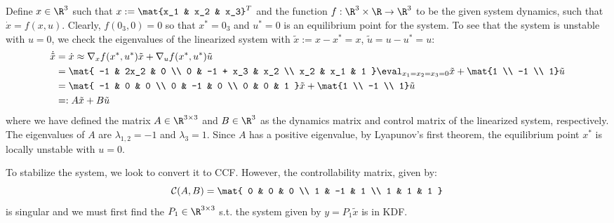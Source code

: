 \documentclass{homework}
\newcommand{\control}{\mathcal{C}}
\begin{document}
\subsection{}
Define $x\in\R^3$ such that $x:=\mat{x_1 & x_2 & x_3}^T$ and the function $f: \R^3 \times \R \to \R^3$
to be the given system dynamics, such that $\dot{x} = f(x,u)$. Clearly, $f(0_3, 0) = 0$ so that 
$x^* = 0_3$ and $u^*=0$ is an equilibrium point for the system. To see that the system is unstable with $u = 0$, we check
the eigenvalues of the linearized system with $\tilde{x} := x - x^* = x$, $\tilde{u} = u - u^* = u$:
\begin{align*}
    \dot{\tilde{x}} &= \dot{x} \approx \nabla_x f(x^*, u^*) \tilde{x} + \nabla_u f(x^*, u^*) \tilde{u} \\
        &= \mat{
            -1 & 2x_2 & 0 \\
            0 & -1 + x_3 & x_2 \\
            x_2 & x_1 & 1
        } \eval_{x_1=x_2=x_3=0} \tilde{x} + \mat{1 \\ -1 \\ 1} \tilde{u} \\
        &= \mat{
            -1 & 0 & 0 \\
            0 & -1 & 0 \\
            0 & 0 & 1
        } \tilde{x} + \mat{1 \\ -1 \\ 1} \tilde{u} \\
        &=: A\tilde{x} + B \tilde{u}
\end{align*}
where we have defined the matrix $A\in\R^{3\times 3}$ and $B\in\R^3$ as the dynamics matrix and control matrix of the linearized system,
respectively.  The eigenvalues of $A$ are $\lambda_{1,2} = -1$ and $\lambda_{3} = 1$. Since $A$ has a positive
eigenvalue, by Lyapunov's first theorem, the equilibrium point $x^*$ is locally unstable with $u=0$.

To stabilize the system, we look to convert it to CCF. However, the controllability matrix, given by:
\begin{equation*}
    \control(A, B) = \mat{
        0 & 0 & 0 \\
        1 & -1 & 1 \\
        1 & 1 & 1
    }
\end{equation*}
is singular and we must first find the $P_1\in\R^{3\times 3}$ s.t. the system given by $y=P_1\tilde{x}$ is in KDF.
\end{document}
